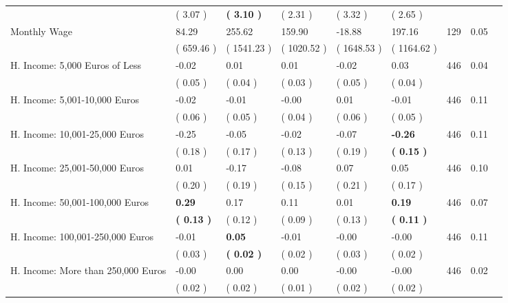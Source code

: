 \begin{tabular}{L{6.2cm} C{1.8cm} C{1.8cm} C{1.8cm} C{1.8cm} C{1.8cm} C{1.8cm} C{0.3cm} C{0.3cm}}
 & (     3.07 ) & \textbf{(     3.10 )} & (     2.31 ) & (     3.32 ) & (     2.65 )  & \\
Monthly Wage &     84.29 &    255.62 &    159.90 &    -18.88 &    197.16  & 129 &       0.05 \\ 
 & (   659.46 ) & (  1541.23 ) & (  1020.52 ) & (  1648.53 ) & (  1164.62 )  & \\
H. Income: 5,000 Euros of Less &     -0.02 &      0.01 &      0.01 &     -0.02 &      0.03  & 446 &       0.04 \\ 
 & (     0.05 ) & (     0.04 ) & (     0.03 ) & (     0.05 ) & (     0.04 )  & \\
H. Income: 5,001-10,000 Euros &     -0.02 &     -0.01 &     -0.00 &      0.01 &     -0.01  & 446 &       0.11 \\ 
 & (     0.06 ) & (     0.05 ) & (     0.04 ) & (     0.06 ) & (     0.05 )  & \\
H. Income: 10,001-25,000 Euros &     -0.25 &     -0.05 &     -0.02 &     -0.07 & \textbf{    -0.26}  & 446 &       0.11 \\ 
 & (     0.18 ) & (     0.17 ) & (     0.13 ) & (     0.19 ) & \textbf{(     0.15 )}  & \\
H. Income: 25,001-50,000 Euros &      0.01 &     -0.17 &     -0.08 &      0.07 &      0.05  & 446 &       0.10 \\ 
 & (     0.20 ) & (     0.19 ) & (     0.15 ) & (     0.21 ) & (     0.17 )  & \\
H. Income: 50,001-100,000 Euros & \textbf{     0.29} &      0.17 &      0.11 &      0.01 & \textbf{     0.19}  & 446 &       0.07 \\ 
 & \textbf{(     0.13 )} & (     0.12 ) & (     0.09 ) & (     0.13 ) & \textbf{(     0.11 )}  & \\
H. Income: 100,001-250,000 Euros &     -0.01 & \textbf{     0.05} &     -0.01 &     -0.00 &     -0.00  & 446 &       0.11 \\ 
 & (     0.03 ) & \textbf{(     0.02 )} & (     0.02 ) & (     0.03 ) & (     0.02 )  & \\
H. Income: More than 250,000 Euros &     -0.00 &      0.00 &      0.00 &     -0.00 &     -0.00  & 446 &       0.02 \\ 
 & (     0.02 ) & (     0.02 ) & (     0.01 ) & (     0.02 ) & (     0.02 )  & \\
\bottomrule
\end{tabular}
